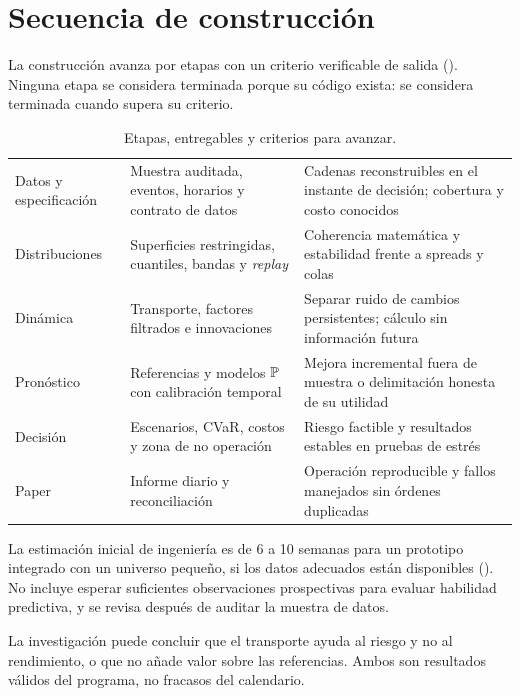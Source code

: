 \clearpage
\section{Secuencia de construcción}\label{sec:secuencia}

La construcción avanza por etapas con un criterio verificable de salida (). Ninguna
etapa se considera terminada porque su código exista: se considera terminada cuando supera su criterio.

\begin{table}[H]
\centering\small
\caption{Etapas, entregables y criterios para avanzar.}
\label{tab:secuencia}
\begin{tabularx}{\linewidth}{@{}>{\RaggedRight}p{2.6cm} Y Y@{}}
\toprule
{} &  & \\
\midrule
Datos y especificación & Muestra auditada, eventos, horarios y contrato de datos & Cadenas reconstruibles en
el instante de decisión; cobertura y costo conocidos\\
Distribuciones & Superficies restringidas, cuantiles, bandas y \emph{replay} & Coherencia matemática y
estabilidad frente a spreads y colas\\
Dinámica & Transporte, factores filtrados e innovaciones & Separar ruido de cambios persistentes; cálculo
sin información futura\\
Pronóstico & Referencias y modelos $\P$ con calibración temporal & Mejora incremental fuera de muestra o
delimitación honesta de su utilidad\\
Decisión & Escenarios, CVaR, costos y zona de no operación & Riesgo factible y resultados estables en
pruebas de estrés\\
Paper & Informe diario y reconciliación & Operación reproducible y fallos manejados sin órdenes duplicadas\\
\bottomrule
\end{tabularx}
\end{table}

La estimación inicial de ingeniería es de 6 a 10 semanas para un prototipo integrado con un universo
pequeño, si los datos adecuados están disponibles (). No incluye esperar
suficientes observaciones prospectivas para evaluar habilidad predictiva, y se revisa después de auditar la
muestra de datos.


\begin{noconcluir}
La investigación puede concluir que el transporte ayuda al riesgo y no al rendimiento, o que no añade valor
sobre las referencias. Ambos son resultados válidos del programa, no fracasos del calendario.
\end{noconcluir}
